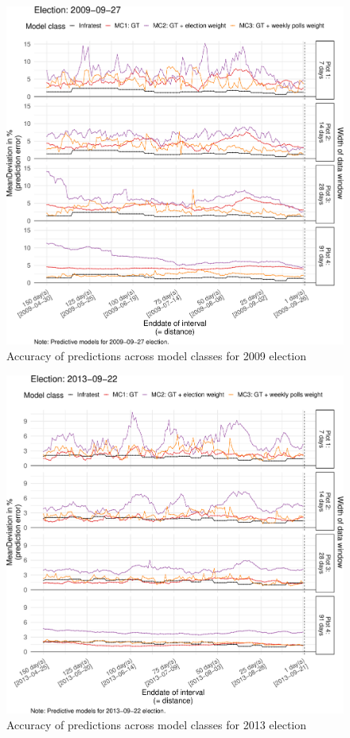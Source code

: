 \documentclass[
  letterpaper,
  DIV=11,
  numbers=noendperiod]{scrartcl}
\begin{document}
\begin{figure}[H]

\caption{\label{fig-A6}Accuracy of predictions across model classes for
2009 election}

{\centering \includegraphics{figures/fig-A6-1.pdf}

}

\end{figure}

\begin{figure}[H]

\caption{\label{fig-A7}Accuracy of predictions across model classes for
2013 election}

{\centering \includegraphics{figures/fig-A7-1.pdf}

}

\end{figure}
\end{document}
